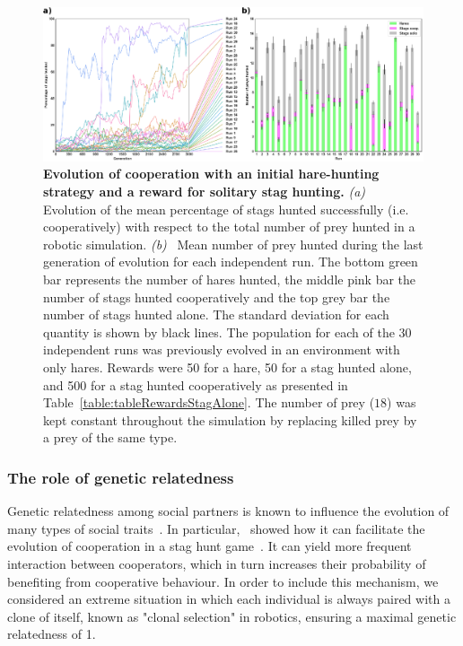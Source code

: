       \begin{figure}[hbtp]
        \centering
          \includegraphics[scale = 1]{fig/ArticleBio1/Fig6.eps}
        \caption{\textbf{Evolution of cooperation with an initial hare-hunting strategy and a reward for solitary stag hunting.}
        {\em (a)}~ Evolution of the mean percentage of stags hunted successfully (i.e. cooperatively) with respect to the total number of prey hunted in a robotic simulation. {\em (b)}~ Mean number of prey hunted during the last generation of evolution for each independent run. The bottom green bar represents the number of hares hunted, the middle pink bar the number of stags hunted cooperatively and the top grey bar the number of stags hunted alone. The standard deviation for each quantity is shown by black lines. The population for each of the 30 independent runs was previously evolved in an environment with only hares. Rewards were 50 for a hare, 50 for a stag hunted alone, and 500 for a stag hunted cooperatively as presented in Table~\ref{table:tableRewardsStagAlone}. The number of prey ($18$) was kept constant throughout the simulation by replacing killed prey by a prey of the same type.}
        \label{fig:graphSolo}
      \end{figure}


    \subsubsection{The role of genetic relatedness}
      Genetic relatedness among social partners is known to influence the evolution of many types of social traits~\cite{Hamilton1964}. In particular,~\cite{Skyrms2004} showed how it can facilitate the evolution of cooperation in a stag hunt game~\cite[chapter 3]{Skyrms2004}. It can yield more frequent interaction between cooperators, which in turn increases their probability of benefiting from cooperative behaviour. In order to include this mechanism, we considered an extreme situation in which each individual is always paired with a clone of itself, known as "clonal selection" in robotics, ensuring a maximal genetic relatedness of 1.

